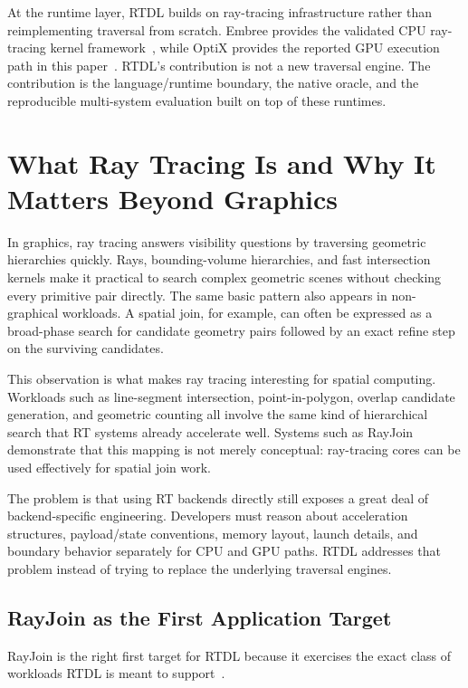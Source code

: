 \documentclass[conference]{IEEEtran}
\begin{document}
At the runtime layer, RTDL builds on ray-tracing infrastructure rather than
reimplementing traversal from scratch. Embree provides the validated CPU
ray-tracing kernel framework~\cite{embree}, while OptiX provides the reported
GPU execution path in this paper~\cite{optix}. RTDL's contribution is not a new
traversal engine. The contribution is the language/runtime boundary, the native
oracle, and the reproducible multi-system evaluation built on top of these
runtimes.

\section{What Ray Tracing Is and Why It Matters Beyond Graphics}

In graphics, ray tracing answers visibility questions by traversing geometric
hierarchies quickly. Rays, bounding-volume hierarchies, and fast intersection
kernels make it practical to search complex geometric scenes without checking
every primitive pair directly. The same basic pattern also appears in
non-graphical workloads. A spatial join, for example, can often be expressed as
a broad-phase search for candidate geometry pairs followed by an exact refine
step on the surviving candidates.

This observation is what makes ray tracing interesting for spatial computing.
Workloads such as line-segment intersection, point-in-polygon, overlap
candidate generation, and geometric counting all involve the same kind of
hierarchical search that RT systems already accelerate well. Systems such as
RayJoin~\cite{rayjoin} demonstrate that this mapping is not merely conceptual:
ray-tracing cores can be used effectively for spatial join work.

The problem is that using RT backends directly still exposes a great deal of
backend-specific engineering. Developers must reason about acceleration
structures, payload/state conventions, memory layout, launch details, and
boundary behavior separately for CPU and GPU paths. RTDL addresses that problem
instead of trying to replace the underlying traversal engines.

\subsection{RayJoin as the First Application Target}

RayJoin is the right first target for RTDL because it exercises the exact class
of workloads RTDL is meant to support~\cite{rayjoin}.
\end{document}
